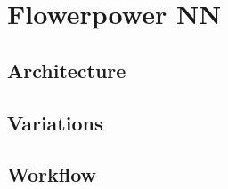 \chapter{Flowerpower NN} \label{chapter:network}

\section{Architecture}

\section{Variations}

\section{Workflow}
